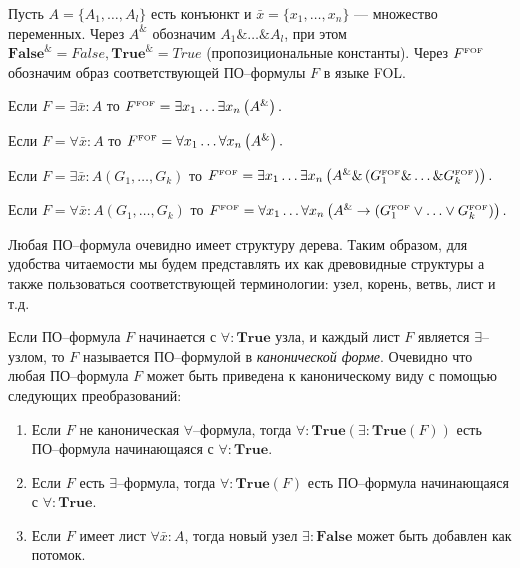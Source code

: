 \begin{definition}\label{def:semantic}
Пусть $A = \{A_1,\ldots,A_l\}$ есть конъюнкт и $\bar{x} = \{x_1,\ldots,x_n\}$ --- множество переменных. Через $A^{\&}$ обозначим $A_1 \&\ldots\&A_l$, при этом $\boldsymbol{False}^{\&}= False, \boldsymbol{True}^{\&}=True$ (пропозициональные константы). Через $F^{\text{\tiny{FOF}}}$ обозначим образ соответствующей ПО--формулы $F$ в языке FOL.

Если $F= \exists \bar{x}\colon A$ то $F^{\text{\tiny{FOF}}} = \exists x_1 \ldots \exists x_n \left(A^{\&}\right).$

Если $F = \forall \bar{x}\colon A$ то $F^{\text{\tiny{FOF}}} = \forall x_1 \ldots \forall x_n \left(A^{\&}\right).$

Если $F = \exists \bar{x}\colon A\left(G_1,\ldots,G_k\right)$ то $F^{\text{\tiny{FOF}}} = \exists x_1 \ldots \exists x_n  \left(A^{\&} \& \left(G_{1}^{\text{\tiny{FOF}}} \& \ldots \& G_{k}^{\text{\tiny{FOF}}}\right)\right).$

Если $F = \forall \bar{x}\colon A\left(G_1,\ldots,G_k\right)$ то $F^{\text{\tiny{FOF}}} = \forall x_1 \ldots \forall x_n \left(A^{\&}\rightarrow \left(G_{1}^{\text{\tiny{FOF}}} \vee\ldots\vee G_{k}^{\text{\tiny{FOF}}}\right)\right).$

\end{definition}

Любая ПО--формула очевидно имеет структуру дерева. Таким образом, для удобства читаемости мы будем представлять их как древовидные структуры а также пользоваться соответствующей терминологии: узел, корень, ветвь, лист и т.д.

Если ПО--формула $F$ начинается с $\forall\colon\boldsymbol{True}$ узла, и каждый лист $F$ является $\exists$--узлом, то $F$ называется ПО--формулой в {\em канонической форме}.
Очевидно что любая ПО--формула $F$ может быть приведена к каноническому виду с помощью следующих преобразований:
\begin{enumerate}
\item Если $F$ не каноническая $\forall$--формула, тогда $\forall\colon \boldsymbol{True}\left(\exists\colon \boldsymbol{True}\left(F\right)\right)$ есть ПО--формула начинающаяся с $\forall\colon\boldsymbol{True}$.
\item Если $F$ есть $\exists$--формула, тогда $\forall\colon \boldsymbol{True}\left(F\right)$ есть ПО--формула начинающаяся с $\forall\colon\boldsymbol{True}$.
\item Если $F$ имеет лист $\forall \bar{x}\colon A$, тогда новый узел $\exists\colon\boldsymbol{False}$ может быть добавлен как потомок.
\end{enumerate}

